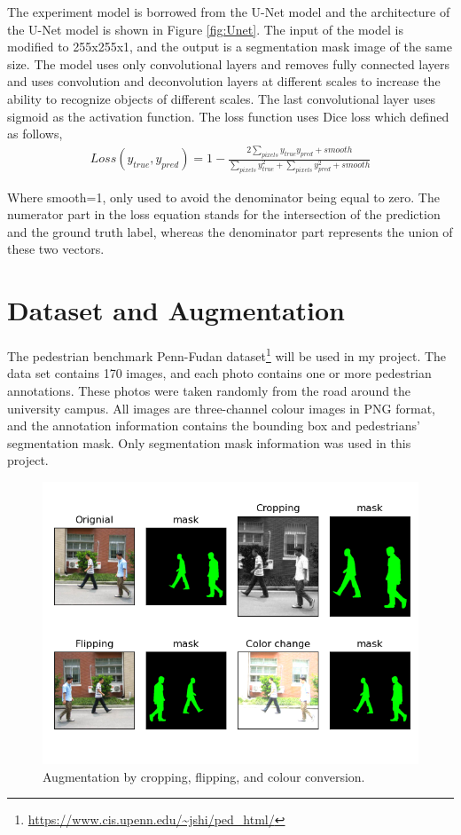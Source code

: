 \documentclass[12pt, a4paper]{article}
\begin{document}
	The experiment model is borrowed from the U-Net model and the architecture of the U-Net model is shown in Figure \ref{fig:Unet}. The input of the model is modified to 255x255x1, and the output is a segmentation mask image of the same size. The model uses only convolutional layers and removes fully connected layers and uses convolution and deconvolution layers at different scales to increase the ability to recognize objects of different scales. The last convolutional layer uses sigmoid as the activation function. The loss function uses Dice loss which defined as follows,
	\begin{equation}
	\begin{aligned}
	Loss(y_{true}, y_{pred}) = 1 - \frac{2\sum_{pixels}y_{true}y_{pred} + smooth }{\sum_{pixels}y_{true}^2 + \sum_{pixels}y_{pred}^2 + smooth}
	\end{aligned}
	\end{equation}
	\par
	Where smooth=1, only used to avoid the denominator being equal to zero. The numerator part in the loss equation stands for the intersection of the prediction and the ground truth label, whereas the denominator part represents the union of these two vectors.


	\section{Dataset and Augmentation} \justify
	The pedestrian benchmark Penn-Fudan dataset\footnote{\label{}\url{https://www.cis.upenn.edu/~jshi/ped_html/}} will be used in my project. The data set contains 170 images, and each photo contains one or more pedestrian annotations. These photos were taken randomly from the road around the university campus. All images are three-channel colour images in PNG format, and the annotation information contains the bounding box and pedestrians’ segmentation mask. Only segmentation mask information was used in this project.
	\begin{figure}[h!] %
       \centering
	  \includegraphics[width=0.5\linewidth]{dataset.png}
	  \caption{Augmentation by cropping, flipping, and colour conversion.}
	  \label{fig:augmentation}
	\end{figure}
\end{document}
